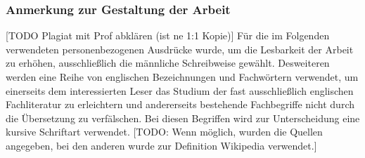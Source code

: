 \subsubsection{Anmerkung zur Gestaltung der Arbeit}
[TODO Plagiat mit Prof abklären (ist ne 1:1 Kopie)]
Für die im Folgenden verwendeten personenbezogenen
Ausdrücke wurde, um die Lesbarkeit der Arbeit zu erhöhen,
ausschließlich die männliche Schreibweise gewählt. Desweiteren werden eine
Reihe von englischen Bezeichnungen und Fachwörtern verwendet, um einerseits dem
interessierten Leser das Studium der fast ausschließlich englischen
Fachliteratur zu erleichtern und andererseits bestehende Fachbegriffe nicht durch die Übersetzung zu verfälschen. Bei diesen Begriffen wird zur Unterscheidung eine kursive Schriftart verwendet.
[TODO: Wenn möglich, wurden die Quellen angegeben, bei den anderen wurde zur Definition Wikipedia verwendet.]

